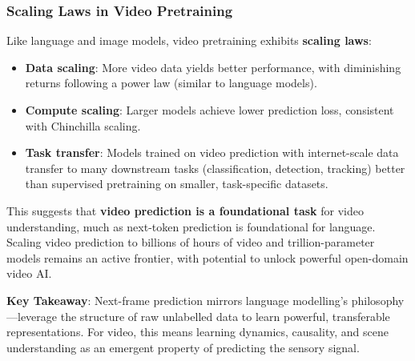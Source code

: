 \subsubsection{Scaling Laws in Video Pretraining}

Like language and image models, video pretraining exhibits \textbf{scaling laws}:
\begin{itemize}
  \item \textbf{Data scaling}: More video data yields better performance, with diminishing returns following a power law (similar to language models).
  \item \textbf{Compute scaling}: Larger models achieve lower prediction loss, consistent with Chinchilla scaling.
  \item \textbf{Task transfer}: Models trained on video prediction with internet-scale data transfer to many downstream tasks (classification, detection, tracking) better than supervised pretraining on smaller, task-specific datasets.
\end{itemize}

This suggests that \textbf{video prediction is a foundational task} for video understanding, much as next-token prediction is foundational for language. Scaling video prediction to billions of hours of video and trillion-parameter models remains an active frontier, with potential to unlock powerful open-domain video AI.

\begin{notebox}
\textbf{Key Takeaway}: Next-frame prediction mirrors language modelling's philosophy—leverage the structure of raw unlabelled data to learn powerful, transferable representations. For video, this means learning dynamics, causality, and scene understanding as an emergent property of predicting the sensory signal.
\end{notebox}
